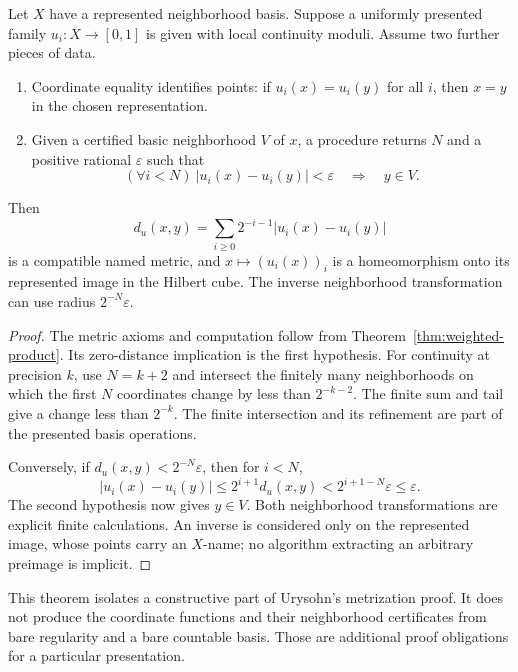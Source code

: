 \begin{theorem}
\label{thm:coordinate-metrization}
Let $X$ have a represented neighborhood basis.  Suppose a uniformly
presented family $u_i:X\to[0,1]$ is given with local continuity moduli.
Assume two further pieces of data.
\begin{enumerate}
\item Coordinate equality identifies points: if $u_i(x)=u_i(y)$ for
all $i$, then $x=y$ in the chosen representation.
\item Given a certified basic neighborhood $V$ of $x$, a procedure returns
$N$ and a positive rational $\varepsilon$ such that
\[
 (\forall i<N)\ |u_i(x)-u_i(y)|<\varepsilon\quad\Longrightarrow\quad y\in V.
\]
\end{enumerate}
Then
\[
 d_u(x,y)=\sum_{i\geq0}2^{-i-1}|u_i(x)-u_i(y)|
\]
is a compatible named metric, and $x\mapsto(u_i(x))_i$ is a homeomorphism
onto its represented image in the Hilbert cube.  The inverse
neighborhood transformation can use radius $2^{-N}\varepsilon$.
\end{theorem}
\begin{proof}
The metric axioms and computation follow from
Theorem~\ref{thm:weighted-product}.  Its zero-distance implication is the
first hypothesis.  For continuity at precision $k$, use $N=k+2$ and
intersect the finitely many neighborhoods on which the first $N$
coordinates change by less than $2^{-k-2}$.  The finite sum and tail
give a change less than $2^{-k}$.  The finite intersection and its
refinement are part of the presented basis operations.

Conversely, if $d_u(x,y)<2^{-N}\varepsilon$, then for $i<N$,
\[
 |u_i(x)-u_i(y)|\leq 2^{i+1}d_u(x,y)
 <2^{i+1-N}\varepsilon\leq\varepsilon.
\]
The second hypothesis now gives $y\in V$.  Both neighborhood transformations
are explicit finite calculations.  An inverse is considered only on the
represented image, whose points carry an $X$-name; no algorithm extracting
an arbitrary preimage is implicit.
\end{proof}

This theorem isolates a constructive part of Urysohn's metrization proof.
It does not produce the coordinate functions and their neighborhood
certificates from bare regularity and a bare countable basis.  Those are
additional proof obligations for a particular presentation.

